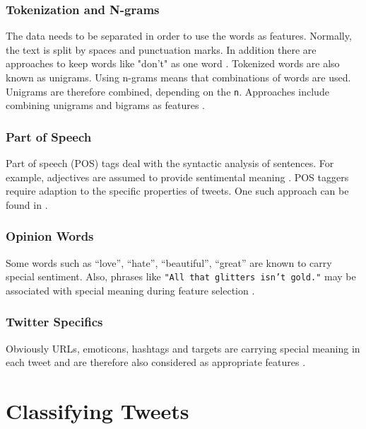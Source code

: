 \documentclass{acm_proc_article-sp}
\begin{document}
\subsubsection{Tokenization and N-grams}

The data needs to be separated in
order to use the words as features. Normally, the text is split by spaces and
punctuation marks. In addition there are approaches to keep words like "don't"
as one word \cite{pak2010twitter}. Tokenized words are also known as unigrams.
Using n-grams means that combinations of words are used. Unigrams are therefore
combined, depending on the \texttt{n}. Approaches include combining
unigrams and bigrams as features \cite{liu2010sentimentanalysis,
go2009twitter}.

\subsubsection{Part of Speech}

Part of speech (POS) tags deal with the
syntactic analysis of sentences. For example, adjectives are assumed to provide
sentimental meaning \cite{liu2010sentimentanalysis}.
POS taggers require adaption to the specific properties of tweets.
One such approach can be found in \cite{gimpel2011part}. 

\subsubsection{Opinion Words}

Some words such as ``love'', ``hate'', ``beautiful'', ``great'' are 
known to carry special sentiment.
Also, phrases like \texttt{"All that glitters
isn't gold."} may be associated with special meaning during feature selection
\cite{liu2010sentimentanalysis}.

\subsubsection{Twitter Specifics}

Obviously URLs, emoticons, hashtags and
targets are carrying special meaning in each tweet and are therefore also
considered as appropriate features \cite{gimpel2011part}.

\section{Classifying Tweets} \label{classification}
\end{document}
